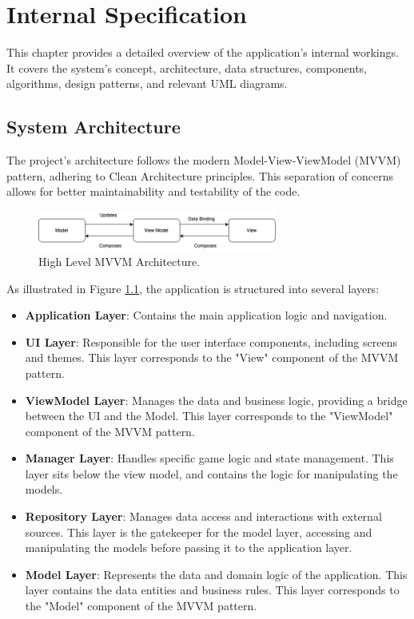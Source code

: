 \chapter{Internal Specification}

This chapter provides a detailed overview of the application's internal workings. It covers the system's concept, architecture, data structures, components, algorithms, design patterns, and relevant UML diagrams.

\section{System Architecture}

The project's architecture follows the modern Model-View-ViewModel (MVVM) pattern, adhering to Clean Architecture principles. This separation of concerns allows for better maintainability and testability of the code.

\begin{figure}[ht!]
    \centering
    \includegraphics[width=0.7\textwidth]{img/mvvm_explanation.png}
    \caption{High Level MVVM Architecture.}
    \label{fig:mvvm_explanation}
\end{figure}

As illustrated in Figure \ref{fig:mvvm_explanation}, the application is structured into several layers:

\begin{itemize}
    \item \textbf{Application Layer}: Contains the main application logic and navigation.
    \item \textbf{UI Layer}: Responsible for the user interface components, including screens and themes. This layer corresponds to the "View" component of the MVVM pattern.
    \item \textbf{ViewModel Layer}: Manages the data and business logic, providing a bridge between the UI and the Model. This layer corresponds to the "ViewModel" component of the MVVM pattern.
    \item \textbf{Manager Layer}: Handles specific game logic and state management. This layer sits below the view model, and contains the logic for manipulating the models.
    \item \textbf{Repository Layer}: Manages data access and interactions with external sources. This layer is the gatekeeper for the model layer, accessing and manipulating the models before passing it to the application layer.
    \item \textbf{Model Layer}: Represents the data and domain logic of the application. This layer contains the data entities and business rules. This layer corresponds to the "Model" component of the MVVM pattern.
\end{itemize}

